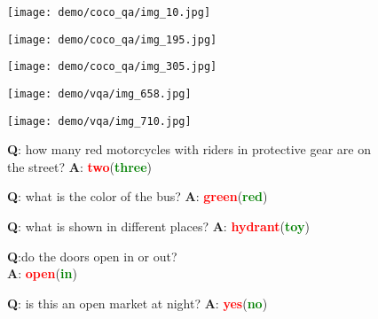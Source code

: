 \documentclass{article}
\begin{document}
\begin{figure}[tp]
\begin{minipage}{0.19\linewidth}
\texttt{[image: demo/coco\_qa/img\_10.jpg]}
\end{minipage}
\begin{minipage}{0.19\linewidth}
\texttt{[image: demo/coco\_qa/img\_195.jpg]}
\end{minipage}
\begin{minipage}{0.19\linewidth}
\texttt{[image: demo/coco\_qa/img\_305.jpg]}
\end{minipage}
\begin{minipage}{0.19\linewidth}
\texttt{[image: demo/vqa/img\_658.jpg]}
\end{minipage}
\begin{minipage}{0.19\linewidth}
\texttt{[image: demo/vqa/img\_710.jpg]}
\end{minipage}

\begin{minipage}{0.19\linewidth}
\begin{center}
\tiny{\textbf{Q}: how many red motorcycles with riders in protective gear are on the street? \textbf{A}: \textcolor{red}{\textbf{two}}(\textcolor{green}{\textbf{three}})}
\end{center}
\end{minipage}
\begin{minipage}{0.19\linewidth}
\begin{center}
\tiny{\textbf{Q}: what is the color of the bus? \textbf{A}: \textcolor{red}{\textbf{green}}(\textcolor{green}{\textbf{red}})}
\end{center}
\end{minipage}
\begin{minipage}{0.19\linewidth}
\begin{center}
\tiny{\textbf{Q}: what is shown in different places? \textbf{A}: \textcolor{red}{\textbf{hydrant}}(\textcolor{green}{\textbf{toy}})}
\end{center}
\end{minipage}
\begin{minipage}{0.19\linewidth}
\begin{center}
\tiny{\textbf{Q}:do the doors open in or out? \\ \textbf{A}: \textcolor{red}{\textbf{open}}(\textcolor{green}{\textbf{in}})}
\end{center}
\end{minipage}
\begin{minipage}{0.19\linewidth}
\begin{center}
\tiny{\textbf{Q}: is this an open market at night?  \textbf{A}: \textcolor{red}{\textbf{yes}}(\textcolor{green}{\textbf{no}})}
\end{center}   
\end{minipage}


\end{figure}
\end{document}
